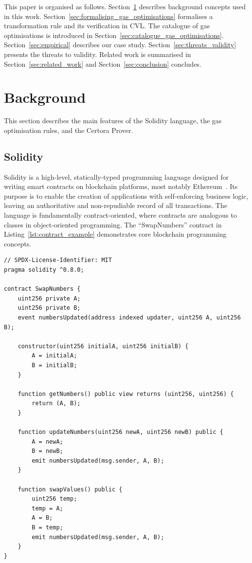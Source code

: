 \documentclass[manuscript,screen,review]{acmart}
\begin{document}
This paper is organised as follows. Section~\ref{sec:background} describes background concepts used in this work. Section~\ref{sec:formalising_gas_optimisations} formalises a transformation rule and its verification in CVL. The catalogue of gas optimisations is introduced in Section~\ref{sec:catalogue_gas_optimisations}. Section~\ref{sec:empirical} describes our case study. Section~\ref{sec:threats_validity} presents the threats to validity.
Related work is summarised in Section~\ref{sec:related_work} and Section~\ref{sec:conclusion} concludes.

\section{Background}
\label{sec:background}

This section describes the main features of the Solidity language, the gas optimisation rules, and the Certora Prover.

\subsection{Solidity}
\label{sec:solidity}

Solidity is a high-level, statically-typed programming language designed for writing smart contracts on blockchain platforms, most notably Ethereum~\cite{SKH19}. Its purpose is to enable the creation of applications with self-enforcing business logic, leaving an authoritative and non-repudiable record of all transactions. The language is fundamentally contract-oriented, where contracts are analogous to classes in object-oriented programming. The ``SwapNumbers'' contract in Listing~\ref{lst:contract_example} demonstrates core blockchain programming concepts.

\begin{listing}[htb]
\begin{scriptsize}
\begin{verbatim}
// SPDX-License-Identifier: MIT
pragma solidity ^0.8.0;

contract SwapNumbers {
    uint256 private A;
    uint256 private B;
    event numbersUpdated(address indexed updater, uint256 A, uint256 B);

    constructor(uint256 initialA, uint256 initialB) {
        A = initialA;
        B = initialB;
    }

    function getNumbers() public view returns (uint256, uint256) {
        return (A, B);
    }

    function updateNumbers(uint256 newA, uint256 newB) public {
        A = newA;
        B = newB;
        emit numbersUpdated(msg.sender, A, B);
    }

    function swapValues() public {
        uint256 temp;
        temp = A;
        A = B;
        B = temp;
        emit numbersUpdated(msg.sender, A, B);
    }
}
\end{verbatim}
\end{scriptsize}
\caption{A contract example.}
\label{lst:contract_example}
\end{listing}
\end{document}
